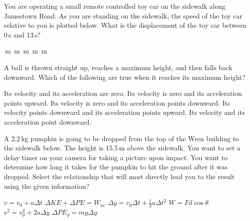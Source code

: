 \documentclass[letterpaper,addpoints,answers]{exam}
\begin{document}
\begin{questions}

\question[5]
You are operating a small remote controlled toy car on the sidewalk along Jamestown Road. As you are standing on the sidewalk, the speed of the toy car relative to you is plotted below.  What is the displacement of the toy car between 0\,s and 13\,s?

\begin{center}
\end{center}
\begin{checkboxes}
 \,m
 \,m
 \,m
 \,m
 \,m
\end{checkboxes}

\question[5]
A ball is thrown straight up, reaches a maximum height, and then falls back downward. Which of the following are true when it reaches its maximum height?
\begin{checkboxes}
 \choice Its velocity and its acceleration are zero.
 \choice Its velocity is zero and its acceleration points upward.
 \choice Its velocity is zero and its acceleration points downward.
 \choice Its velocity points downward and its acceleration points upward.
 \choice Its velocity and its acceleration point downward.
\end{checkboxes}

\question[5]
A 2.2\,kg pumpkin is going to be dropped from the top of the Wren building to the sidewalk below. The height is 15.5\,m above the sidewalk. You want to set a delay timer on your camera for taking a picture upon impact. You want to determine how long it takes for the pumpkin to hit the ground after it was dropped. Select the relationship that will most directly lead you to the result using the given information?
\begin{checkboxes}
 \choice $v = v_0 + a \Delta t$
 \choice $\Delta KE + \Delta PE = W_{nc}$
 \choice $\Delta y = v_0 \Delta t + \frac{1}{2} a \Delta t^2$
 \choice $W = F d \cos \theta$
 \choice $v^2 = v_0^2 + 2 a \Delta y$
 \choice $\Delta PE_g = m g \Delta y$
\end{checkboxes}


\end{questions}
\end{document}
